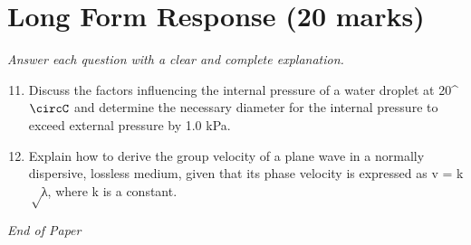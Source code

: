 \documentclass[12pt]{article}
\begin{document}
\section*{Long Form Response (20 marks)}
\textit{Answer each question with a clear and complete explanation.}
\begin{enumerate}[label=\arabic*.]
\setcounter{enumi}{10}
\item Discuss the factors influencing the internal pressure of a water droplet at 20^\ensuremath{\circC} and determine the necessary diameter for the internal pressure to exceed external pressure by 1.0 kPa.
\item Explain how to derive the group velocity of a plane wave in a normally dispersive, lossless medium, given that its phase velocity is expressed as v = k\ensuremath{\sqrt}λ, where k is a constant.
\end{enumerate}

\vfill
\noindent\textit{End of Paper}
\end{document}
